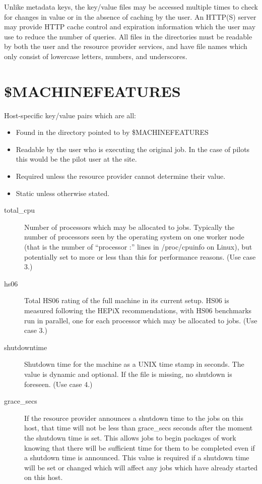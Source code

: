 \documentclass[12pt,a4paper]{article}
\begin{document}
Unlike metadata keys, the key/value files may be
accessed multiple times to check for changes in value or in the
absence of caching by the user. An HTTP(S) server may provide HTTP cache
control and expiration information which the user may use to reduce the
number of queries.
All files in the directories must be readable by both the user and the
resource provider services, and have file names which only consist of
lowercase letters, numbers, and underscores.

\section{\$MACHINEFEATURES}
\label{sec:MACHINEFEATURES}

Host-specific key/value pairs which are all:

\begin{itemize}
\item Found in the directory pointed to by \$MACHINEFEATURES
\item Readable by the user who is executing the original job. In the case
      of pilots this would be the pilot user at the site.
\item Required unless the resource provider cannot determine their value.
\item Static unless otherwise stated.
\end{itemize}

\begin{description}

\item[total\_cpu] Number of processors which may be allocated to
jobs. Typically the number of processors seen by the operating system on one
worker node (that is the number of ``processor :'' lines in /proc/cpuinfo on
Linux), but potentially set to more or less than this for performance
reasons. (Use case 3.)

\item[hs06] Total HS06 rating of the full machine in its current
setup. HS06 is measured following the HEPiX recommendations\cite{HEPIXHS06}, with 
HS06 benchmarks run in parallel, one for each processor which may be 
allocated to jobs. (Use case 3.)

\item[shutdowntime] Shutdown time for the machine as a UNIX time stamp 
in seconds. The value is dynamic and optional. If the file is missing, 
no shutdown is foreseen.  (Use case 4.)

\item[grace\_secs] If the resource provider announces a
shutdown time to the jobs on this host, that time will not be less than 
grace\_secs seconds after the moment the shutdown time is set. This 
allows jobs to begin packages of work knowing that there will be sufficient 
time for them to be completed even if a shutdown time is announced. 
This value is required if a shutdown time will be set or changed
which will affect any jobs which have already started on this host.

\end{description}
\end{document}
